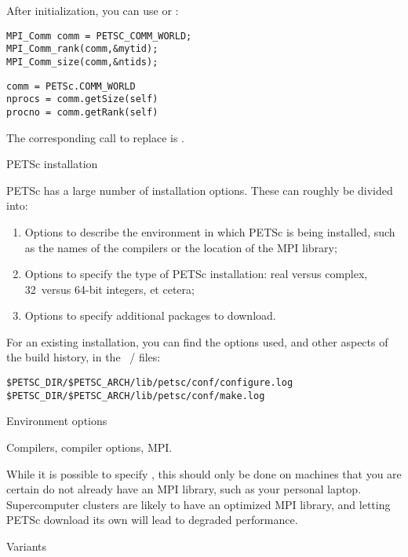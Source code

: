 After initialization, you can use  or
:

\begin{lstlisting}
MPI_Comm comm = PETSC_COMM_WORLD;
MPI_Comm_rank(comm,&mytid);
MPI_Comm_size(comm,&ntids);
\end{lstlisting}

\begin{pythonnote}
\begin{verbatim}
comm = PETSc.COMM_WORLD
nprocs = comm.getSize(self) 
procno = comm.getRank(self)
\end{verbatim}
\end{pythonnote}

The corresponding call to replace  is
.

 {PETSc installation}

PETSc has a large number of installation options. These can roughly be
divided into:
\begin{enumerate}
\item Options to describe the environment in which PETSc is being
  installed, such as the names of the compilers or the location of the
  MPI library;
\item Options to specify the type of PETSc installation: real versus
  complex, 32~versus 64-bit integers, et cetera;
\item Options to specify additional packages to download.
\end{enumerate}

For an existing installation, you can find the options used,
and other aspects of the build history,
in the ~/ 
files:
\begin{verbatim}
$PETSC_DIR/$PETSC_ARCH/lib/petsc/conf/configure.log
$PETSC_DIR/$PETSC_ARCH/lib/petsc/conf/make.log
\end{verbatim}

 {Environment options}

Compilers, compiler options, MPI.

While it is possible to specify ,
this should only be done on machines that you are certain do not
already have an MPI library, such as your personal
laptop. Supercomputer clusters are likely to have an optimized MPI
library, and letting PETSc download its own will lead to degraded
performance.

 {Variants}

